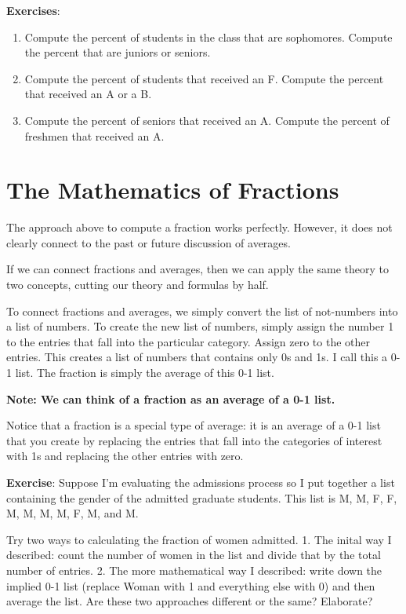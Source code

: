 \documentclass[]{book}
\providecommand{\tightlist}{%
  \setlength{\itemsep}{0pt}\setlength{\parskip}{0pt}}
\theoremstyle{definition}
\theoremstyle{definition}
\theoremstyle{definition}
\theoremstyle{remark}
\begin{document}
\textbf{Exercises}:

\begin{enumerate}
\def\labelenumi{\arabic{enumi}.}
\tightlist
\item
  Compute the percent of students in the class that are sophomores.
  Compute the percent that are juniors or seniors.
\item
  Compute the percent of students that received an F. Compute the
  percent that received an A or a B.
\item
  Compute the percent of seniors that received an A. Compute the percent
  of freshmen that received an A.
\end{enumerate}

\section{The Mathematics of
Fractions}\label{the-mathematics-of-fractions}

The approach above to compute a fraction works perfectly. However, it
does not clearly connect to the past or future discussion of averages.

If we can connect fractions and averages, then we can apply the same
theory to two concepts, cutting our theory and formulas by half.

To connect fractions and averages, we simply convert the list of
not-numbers into a list of numbers. To create the new list of numbers,
simply assign the number 1 to the entries that fall into the particular
category. Assign zero to the other entries. This creates a list of
numbers that contains only 0s and 1s. I call this a 0-1 list. The
fraction is simply the average of this 0-1 list.

\textbf{Note: We can think of a fraction as an average of a 0-1 list.}

Notice that a fraction is a special type of average: it is an average of
a 0-1 list that you create by replacing the entries that fall into the
categories of interest with 1s and replacing the other entries with
zero.

\textbf{Exercise}: Suppose I'm evaluating the admissions process so I
put together a list containing the gender of the admitted graduate
students. This list is M, M, F, F, M, M, M, M, F, M, and M.

Try two ways to calculating the fraction of women admitted. 1. The
inital way I described: count the number of women in the list and divide
that by the total number of entries. 2. The more mathematical way I
described: write down the implied 0-1 list (replace Woman with 1 and
everything else with 0) and then average the list. Are these two
approaches different or the same? Elaborate?
\end{document}
